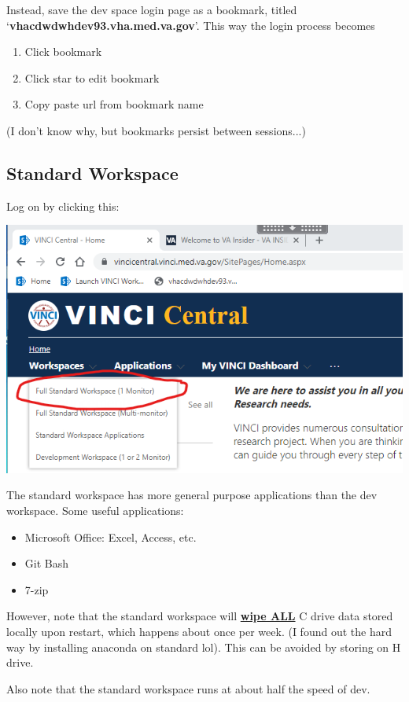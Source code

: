 \documentclass[12pt]{article}
\theoremstyle{definition}
\begin{document}
Instead, save the dev space login page as a bookmark, titled `\textbf{vhacdwdwhdev93.vha.med.va.gov}'. This way the login process becomes \begin{enumerate}
    \item Click bookmark
    \item Click star to edit bookmark
    \item Copy paste url from bookmark name
\end{enumerate}

(I don't know why, but bookmarks persist between sessions...)

\subsection{Standard Workspace}
Log on by clicking this:

\includegraphics[width=\linewidth]{screenshots/vinci-connect-std.png}

The standard workspace has more general purpose applications than the dev workspace. Some useful applications:
\begin{itemize}
    \item Microsoft Office: Excel, Access, etc. 
    \item Git Bash
    \item 7-zip
\end{itemize}

However, note that the standard workspace will \underline{\textbf{wipe ALL}} C drive data stored locally upon restart, which happens about once per week. (I found out the hard way by installing anaconda on standard lol). This can be avoided by storing on H drive.

Also note that the standard workspace runs at about half the speed of dev.
\end{document}
